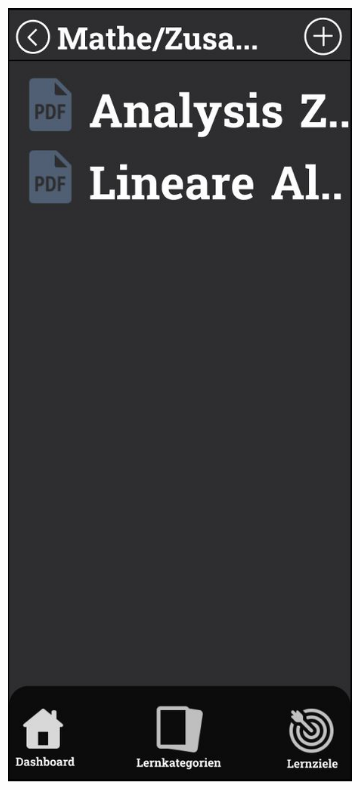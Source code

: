     \newpage

    \begin{figure}[htbp]
        \centering
        \begin{subfigure}[b]{0.45\linewidth}
          \centering
          \includegraphics[width=\linewidth]{images/Mockups/Summaries.JPG}

\end{subfigure}
\end{figure}
